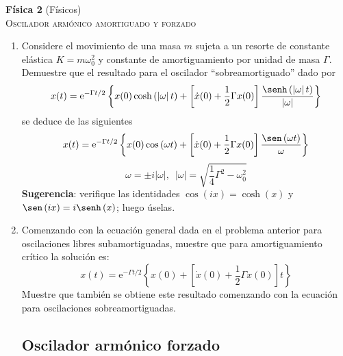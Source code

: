 \documentclass[11pt,spanish,a4paper]{article}
\begin{document}
\begin{center}
\textbf{Física 2} (Físicos) \hfill {}\\
\textsc{\LARGE Oscilador armónico amortiguado y forzado}\\
\end{center}


\begin{enumerate}


\subsection*{Oscilador armónico amortiguado}

\item Considere el movimiento de una masa $m$ sujeta a un resorte de constante elástica $K= m \omega_0^2$ y constante de amortiguamiento por unidad de masa $\Gamma$. \\
Demuestre que el resultado para el oscilador ``sobreamortiguado'' dado por
\[
x(t)=\mathrm{e}^{-\Gamma t/2}\left\{ x(0)\cosh\left(\left|\omega\right|t\right)+\left[\dot{x}(0)+\frac{1}{2}\Gamma x(0)\right]\frac{\senh\left(\left|\omega\right|t\right)}{\left|\omega\right|}\right\} 
\]
se deduce de las siguientes
\[
x(t)=\mathrm{e}^{-\Gamma t/2}\left\{ x(0)\cos\left(\omega t\right)+\left[\dot{x}(0)+\frac{1}{2}\Gamma x(0)\right]\frac{\sen\left(\omega t\right)}{\omega}\right\} 
\]
\[
\omega=\pm i\left|\omega\right|,\,\,\,\left|\omega\right|=\sqrt{\frac{1}{4}\Gamma^{2}-\omega_{0}^{2}}
\]
\textbf{Sugerencia}: verifique las identidades $\cos\left(ix\right)=\cosh\left(x\right)$ y $\sen\left(ix\right)=i\senh\left(x\right)$; luego úselas.



\item Comenzando con la ecuación general dada en el problema anterior para oscilaciones libres subamortiguadas, muestre que para amortiguamiento crítico la solución es:
\[
x(t)=\mathrm{e}^{-\Gamma t/2}\left\{ x(0)+\left[\dot{x}(0)+\frac{1}{2}\Gamma x(0)\right]t\right\} 
\]
Muestre que también se obtiene este resultado comenzando con la ecuación para oscilaciones sobreamortiguadas.



\subsection*{Oscilador armónico forzado}


\end{enumerate}
\end{document}
